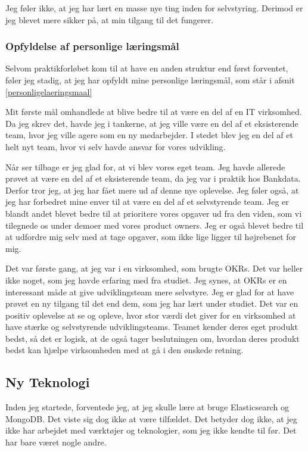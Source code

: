 \documentclass[a4paper]{article}
\begin{document}
Jeg føler ikke, at jeg har lært en masse nye ting inden for selvstyring.
Derimod er jeg blevet mere sikker på, at min tilgang til det fungerer.

\subsubsection{Opfyldelse af personlige læringsmål}
Selvom praktikforløbet kom til at have en anden struktur end først forventet,
føler jeg stadig, at jeg har opfyldt mine personlige læringsmål,
som står i afsnit \ref{personligelaeringsmaal}

Mit første mål omhandlede at blive bedre til at være en del af en IT virksomhed.
Da jeg skrev det, havde jeg i tankerne,
at jeg ville være en del af et eksisterende team,
hvor jeg ville agere som en ny medarbejder.
I stedet blev jeg en del af et helt nyt team,
hvor vi selv havde ansvar for vores udvikling.

Når ser tilbage er jeg glad for, at vi blev vores eget team.
Jeg havde allerede prøvet at være en del af et eksisterende team,
da jeg var i praktik hos Bankdata.
Derfor tror jeg, at jeg har fået mere ud af denne nye oplevelse.
Jeg føler også,
at jeg har forbedret mine enver til at være en del af et selvstyrende team.
Jeg er blandt andet blevet bedre til at prioritere vores opgaver ud fra den viden,
som vi tilegnede os under demoer med vores product owners.
Jeg er også blevet bedre til at udfordre mig selv med at tage opgaver,
som ikke lige ligger til højrebenet for mig.

Det var første gang, at jeg var i en virksomhed, som brugte OKRs.
Det var heller ikke noget, som jeg havde erfaring med fra studiet.
Jeg synes, at OKRs er en interessant måde at give udviklingsteam mere selvstyre.
Jeg er glad for at have prøvet en ny tilgang til det end dem,
som jeg har lært under studiet.
Det var en positiv oplevelse at se og opleve,
hvor stor værdi det giver for en virksomhed at have stærke og selvstyrende udviklingsteams.
Teamet kender deres eget produkt bedst,
så det er logisk,
at de også tager beslutningen om,
hvordan deres produkt bedst kan hjælpe virksomheden med at gå i den ønskede retning.

\subsection{Ny Teknologi}
Inden jeg startede, forventede jeg,
at jeg skulle lære at bruge Elasticsearch og MongoDB.
Det viste sig dog ikke at være tilfældet.
Det betyder dog ikke, at jeg ikke har arbejdet med værktøjer og teknologier,
som jeg ikke kendte til før.
Det har bare været nogle andre.
\end{document}
